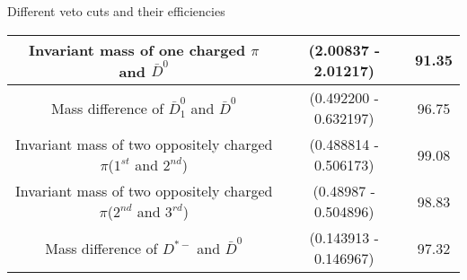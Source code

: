 \documentclass[12pt]{beamer}
\begin{document}
\begin{frame}{Different veto cuts and their efficiencies}
\begin{table}[htbp]
{\begin{tabular}{|c|c|c|}
			\hline
			Invariant mass of one charged $\pi$ and $\bar{D}^{0}$ & (2.00837 - 2.01217) & 91.35 \\
			\hline
			Mass difference of $\bar{D}^{0}_{1}$ and $\bar{D}^{0}$ & (0.492200 - 0.632197) & 96.75 \\
			\hline
			Invariant mass of two oppositely charged $\pi$($1^{st}$ and $2^{nd}$) & (0.488814 - 0.506173) & 99.08 \\
			\hline
			Invariant mass of two oppositely charged $\pi$($2^{nd}$ and $3^{rd}$) & (0.48987 - 0.504896) & 98.83 \\
			\hline
			Mass difference of $D^{*-}$ and $\bar{D}^{0}$ & (0.143913 - 0.146967) & 97.32 \\
			\hline
		\end{tabular}%
		}
		\label{tab:veto}
	\end{table}
\end{frame}
\end{document}
